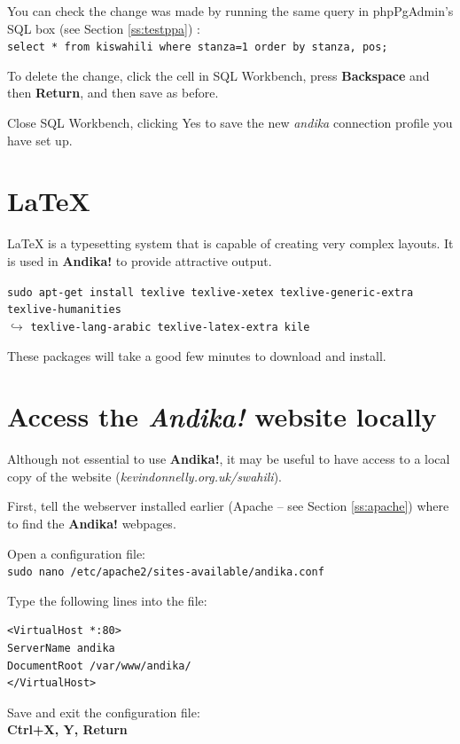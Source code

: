 You can check the change was made by running the same query in phpPgAdmin's SQL box (see Section \ref{ss:testppa}) :\\
\verb|select * from kiswahili where stanza=1 order by stanza, pos;|

To delete the change, click the cell in SQL Workbench, press \textbf{Backspace} and then \textbf{Return}, and then save as before.

Close SQL Workbench, clicking Yes to save the new \textit{andika} connection profile you have set up.


\section{LaTeX}

LaTeX is a typesetting system that is capable of creating very complex layouts.  It is used in \textbf{Andika!} to provide attractive output.

\verb|sudo apt-get install texlive texlive-xetex texlive-generic-extra texlive-humanities|\\
$\hookrightarrow$ \verb|texlive-lang-arabic texlive-latex-extra kile|

These packages will take a good few minutes to download and install.


\section{Access the \textit{Andika!} website locally}
\label{s:localaccess}

Although not essential to use \textbf{Andika!}, it may be useful to have access to a local copy of the website (\textit{kevindonnelly.org.uk/swahili}).  

First, tell the webserver installed earlier (Apache -- see Section \ref{ss:apache}) where to find the\textbf{ Andika!} webpages.

Open a configuration file:\\
\verb|sudo nano /etc/apache2/sites-available/andika.conf|

Type the following lines into the file:\\
\vspace{-0.5cm}  %
\begin{verbatim}
<VirtualHost *:80>
ServerName andika
DocumentRoot /var/www/andika/
</VirtualHost>
\end{verbatim}

Save and exit the configuration file:\\
\textbf{Ctrl+X, Y, Return}

